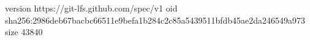 version https://git-lfs.github.com/spec/v1
oid sha256:2986deb67bacbc66511e9befa1b284c2c85a5439511bfdb45ae2da246549a973
size 43840
